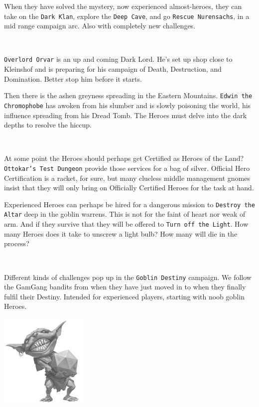 When they have solved the mystery, now experienced almost-heroes, they can take on the \texttt{Dark Klan}, explore the \texttt{Deep Cave}, and go \texttt{Rescue Nurensachs}, in a mid range campaign arc. Also with completely new challenges.

\

\noindent
\texttt{Overlord Orvar} is an up and coming Dark Lord. He's set up shop close to Kleinshof and is preparing for his campaign of Death, Destruction, and Domination. Better stop him before it starts.

Then there is the ashen greyness spreading in the Eastern Mountains. \texttt{Edwin the Chromophobe} has awoken from his slumber and is slowly poisoning the world, his influence spreading from his Dread Tomb. The Heroes must delve into the dark depths to resolve the hiccup.

\

\noindent
At some point the Heroes should perhaps get Certified as Heroes of the Land? \texttt{Ottokar's Test Dungeon} provide those services for a bag of silver. Official Hero Certification is a racket, for sure, but many clueless middle management gnomes insist that they will only bring on Officially Certified Heroes for the task at hand.

Experienced Heroes can perhaps be hired for a dangerous mission to \texttt{Destroy the Altar} deep in the goblin warrens. This is not for the faint of heart nor weak of arm. And if they survive that they will be offered to \texttt{Turn off the Light}. How many Heroes does it take to unscrew a light bulb? How many will die in the process?

\

\noindent
Different kinds of challenges pop up in the \texttt{Goblin Destiny} campaign. We follow the GamGang bandits from when they have just moved in to when they finally fulfil their Destiny. Intended for experienced players, starting with noob goblin Heroes.


\vfill

\begin{center}
\includegraphics[height=45mm]{./fig/dicegoblin.jpg}
\end{center}








